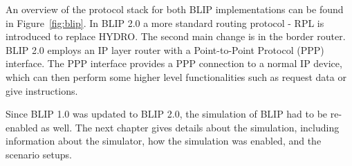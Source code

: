 An overview of the protocol stack for both BLIP implementations can be found in Figure~\ref{fig:blip}. In BLIP 2.0 a more standard routing protocol - RPL is introduced to replace HYDRO. The second main change is in the border router. BLIP 2.0 employs an IP layer router with a Point-to-Point Protocol (PPP) interface. The PPP interface provides a PPP connection to a normal IP device, which can then perform some higher level functionalities such as request data or give instructions.


Since BLIP 1.0 was updated to BLIP 2.0, the simulation of BLIP had to be re-enabled as well. The next chapter gives details about the simulation, including information about the simulator, how the simulation was enabled, and the scenario setups.
